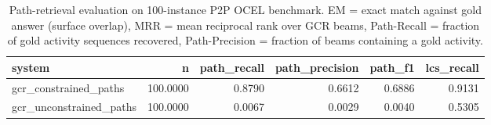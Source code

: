 \begin{table}
\caption{Path-retrieval evaluation on 100-instance P2P OCEL benchmark. EM = exact match against gold answer (surface overlap), MRR = mean reciprocal rank over GCR beams, Path-Recall = fraction of gold activity sequences recovered, Path-Precision = fraction of beams containing a gold activity.}
\label{tab:path_results}
\begin{tabular}{lrrrrr}
\toprule
system & n & path_recall & path_precision & path_f1 & lcs_recall \\
\midrule
gcr_constrained_paths & 100.0000 & 0.8790 & 0.6612 & 0.6886 & 0.9131 \\
gcr_unconstrained_paths & 100.0000 & 0.0067 & 0.0029 & 0.0040 & 0.5305 \\
\bottomrule
\end{tabular}
\end{table}
